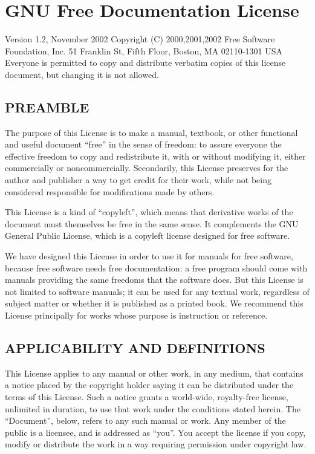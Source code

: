 
\chapter{GNU Free Documentation License}

Version 1.2, November 2002 Copyright (C) 2000,2001,2002 Free Software
Foundation, Inc. 51 Franklin St, Fifth Floor, Boston, MA 02110-1301 USA
Everyone is permitted to copy and distribute verbatim copies of this
license document, but changing it is not allowed.

\section{PREAMBLE}\label{preamble}

The purpose of this License is to make a manual, textbook, or other
functional and useful document ``free'' in the sense of freedom: to
assure everyone the effective freedom to copy and redistribute it, with
or without modifying it, either commercially or noncommercially.
Secondarily, this License preserves for the author and publisher a way
to get credit for their work, while not being considered responsible for
modifications made by others.

This License is a kind of ``copyleft'', which means that derivative
works of the document must themselves be free in the same sense. It
complements the GNU General Public License, which is a copyleft license
designed for free software.

We have designed this License in order to use it for manuals for free
software, because free software needs free documentation: a free program
should come with manuals providing the same freedoms that the software
does. But this License is not limited to software manuals; it can be
used for any textual work, regardless of subject matter or whether it is
published as a printed book. We recommend this License principally for
works whose purpose is instruction or reference.

\section{APPLICABILITY AND
DEFINITIONS}\label{applicability-and-definitions}

This License applies to any manual or other work, in any medium, that
contains a notice placed by the copyright holder saying it can be
distributed under the terms of this License. Such a notice grants a
world-wide, royalty-free license, unlimited in duration, to use that
work under the conditions stated herein. The ``Document'', below, refers
to any such manual or work. Any member of the public is a licensee, and
is addressed as ``you''. You accept the license if you copy, modify or
distribute the work in a way requiring permission under copyright law.

